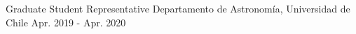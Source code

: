 

\begin{cvhonors}
	\cvhonor
	{Graduate Student Representative} %
	{Departamento de Astronom\'ia, Universidad de Chile} %
	{} %
	{Apr. 2019 - Apr. 2020} %

	
\end{cvhonors}